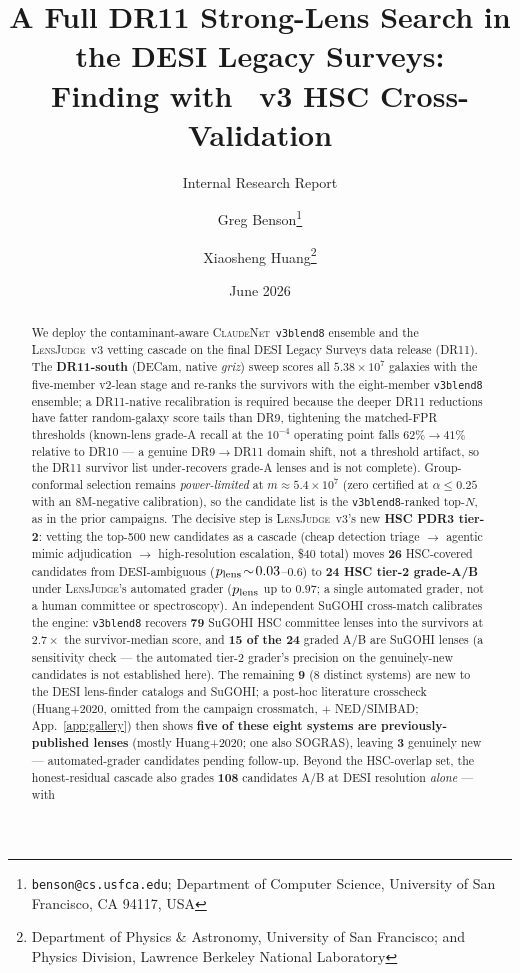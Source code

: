 \documentclass[11pt,letterpaper]{article}
\title{A Full DR11 Strong-Lens Search in the DESI Legacy Surveys:\\
       \cnet{} \vb{} Finding with \lj{}~v3 HSC Cross-Validation}
\author{Greg Benson\thanks{\texttt{benson@cs.usfca.edu}; Department of Computer
        Science, University of San Francisco, CA 94117, USA} \and
        Xiaosheng Huang\thanks{Department of Physics \& Astronomy, University of
        San Francisco; and Physics Division, Lawrence Berkeley National Laboratory}}
\date{June 2026}
\newcommand{\cnet}{\textsc{ClaudeNet}}
\newcommand{\lj}{\textsc{LensJudge}}
\newcommand{\vb}{\texttt{v3blend8}}
\begin{document}
\maketitle
\subtitle{Internal Research Report}

\begin{abstract}
We deploy the contaminant-aware \cnet{}~\vb{} ensemble and the \lj{}~v3 vetting cascade on the final
DESI Legacy Surveys data release (DR11). The \textbf{DR11-south} (DECam, native \emph{griz}) sweep
scores all \textbf{$5.38\times10^{7}$} galaxies with the five-member v2-lean stage and re-ranks the
survivors with the eight-member \vb{} ensemble; a DR11-native recalibration is required because the
deeper DR11 reductions have fatter random-galaxy score tails than DR9, tightening the matched-FPR
thresholds (known-lens grade-A recall at the $10^{-4}$ operating point falls $62\%\!\to\!41\%$ relative
to DR10 --- a genuine DR9$\to$DR11 domain shift, not a threshold artifact, so the DR11 survivor list
under-recovers grade-A lenses and is not complete). Group-conformal selection remains
\emph{power-limited} at $m\!\approx\!5.4\times10^{7}$ (zero certified at $\alpha\le0.25$ with an
$8$M-negative calibration), so the candidate list is the \vb{}-ranked top-$N$, as in the prior
campaigns. The decisive step is \lj{}~v3's new \textbf{HSC PDR3 tier-2}: vetting the top-500 new
candidates as a cascade (cheap detection triage $\to$ agentic mimic adjudication $\to$ high-resolution
escalation, \$40 total) moves \textbf{26} HSC-covered candidates from DESI-ambiguous
($p_{\rm lens}\!\sim\!0.03$--$0.6$) to \textbf{24 HSC tier-2 grade-A/B} under \lj{}'s automated grader
($p_{\rm lens}$ up to $0.97$; a single automated grader, not a human committee or spectroscopy). An
independent SuGOHI cross-match calibrates the engine: \vb{} recovers \textbf{79} SuGOHI HSC committee
lenses into the survivors at $2.7\times$ the survivor-median score, and \textbf{15 of the 24} graded
A/B are SuGOHI lenses (a sensitivity check --- the automated tier-2 grader's precision on the
genuinely-new candidates is not established here). The remaining \textbf{9} (8 distinct systems) are
new to the DESI lens-finder catalogs and SuGOHI; a post-hoc literature crosscheck (Huang+2020, omitted
from the campaign crossmatch, $+$ NED/SIMBAD; App.~\ref{app:gallery}) then shows \textbf{five of these
eight systems are previously-published lenses} (mostly Huang+2020; one also SOGRAS), leaving \textbf{3}
genuinely new --- automated-grader candidates pending follow-up. Beyond the HSC-overlap set, the
honest-residual cascade also grades \textbf{108} candidates A/B at DESI resolution \emph{alone} --- with

\end{abstract}
\end{document}
